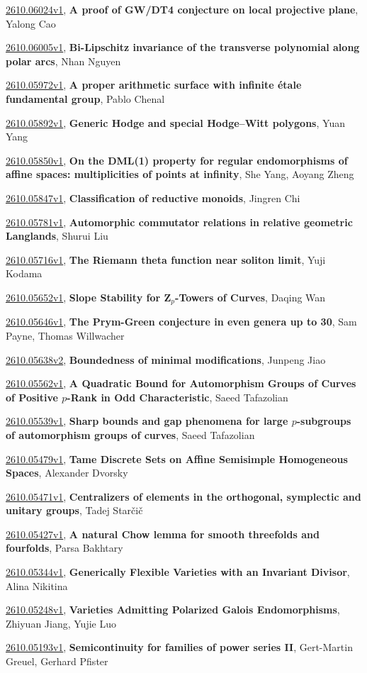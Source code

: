 \documentclass[9pt, a4paper]{article}
\theoremstyle{plain}
\theoremstyle{definition}
\theoremstyle{remark}
\newcommand{\arxiv}[3]{\href{https://arxiv.org/abs/#1}{#1}, \textbf{\textcolor{arxivblue}{#2}}, #3}
\begin{document}
\arxiv{2610.06024v1}{A proof of GW/DT4 conjecture on local projective plane}{Yalong Cao}

\arxiv{2610.06005v1}{Bi-Lipschitz invariance of the transverse polynomial along polar arcs}{Nhan Nguyen}

\arxiv{2610.05972v1}{A proper arithmetic surface with infinite étale fundamental group}{Pablo Chenal}

\arxiv{2610.05892v1}{Generic Hodge and special Hodge--Witt polygons}{Yuan Yang}

\arxiv{2610.05850v1}{On the DML(1) property for regular endomorphisms of affine spaces: multiplicities of points at infinity}{She Yang, Aoyang Zheng}

\arxiv{2610.05847v1}{Classification of reductive monoids}{Jingren Chi}

\arxiv{2610.05781v1}{Automorphic commutator relations in relative geometric Langlands}{Shurui Liu}

\arxiv{2610.05716v1}{The Riemann theta function near soliton limit}{Yuji Kodama}

\arxiv{2610.05652v1}{Slope Stability for ${\mathbf Z}_p$-Towers of Curves}{Daqing Wan}

\arxiv{2610.05646v1}{The Prym-Green conjecture in even genera up to 30}{Sam Payne, Thomas Willwacher}

\arxiv{2610.05638v2}{Boundedness of minimal modifications}{Junpeng Jiao}

\arxiv{2610.05562v1}{A Quadratic Bound for Automorphism Groups of Curves of Positive $p$-Rank in Odd Characteristic}{Saeed Tafazolian}

\arxiv{2610.05539v1}{Sharp bounds and gap phenomena for large $p$-subgroups of automorphism groups of curves}{Saeed Tafazolian}

\arxiv{2610.05479v1}{Tame Discrete Sets on Affine Semisimple Homogeneous Spaces}{Alexander Dvorsky}

\arxiv{2610.05471v1}{Centralizers of elements in the orthogonal, symplectic and unitary groups}{Tadej Starčič}

\arxiv{2610.05427v1}{A natural Chow lemma for smooth threefolds and fourfolds}{Parsa Bakhtary}

\arxiv{2610.05344v1}{Generically Flexible Varieties with an Invariant Divisor}{Alina Nikitina}

\arxiv{2610.05248v1}{Varieties Admitting Polarized Galois Endomorphisms}{Zhiyuan Jiang, Yujie Luo}

\arxiv{2610.05193v1}{Semicontinuity for families of power series II}{Gert-Martin Greuel, Gerhard Pfister}
\end{document}
